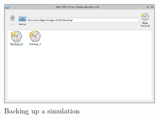 \begin{figure}[H]
\centering
\includegraphics[width=0.7\textwidth]{./images/backup.png}
\caption{Backing up a simulation}
\label{fig:backup}
\end{figure}

